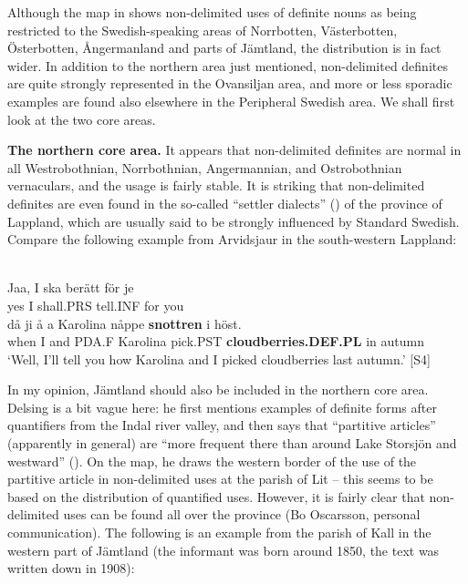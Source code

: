 Although the map in \citet{Delsing2003a} shows non-delimited uses of definite nouns as being restricted to the Swedish-speaking areas of Norrbotten, Västerbotten, Österbotten, Ångermanland and parts of Jämtland, the distribution is in fact wider. In addition to the northern area just mentioned, non-delimited definites are quite strongly represented in the Ovansiljan area, and more or less sporadic examples are found also elsewhere in the Peripheral Swedish area. We shall first look at the two core areas.


\textbf{The northern core area. }It appears that non-delimited definites are normal in all Westrobothnian, Norrbothnian, Angermannian, and Ostrobothnian vernaculars, and the usage is fairly stable. It is striking that non-delimited definites are even found in the so-called “settler dialects” () of the province of Lappland, which are usually said to be strongly influenced by Standard Swedish. Compare the following example from Arvidsjaur in the south-western Lappland:


\ea \label{} 
\\
\gll Jaa,  I  ska  berätt  för  je\\
yes  I  shall.PRS  tell.INF  for  you\\
\gll då  ji  å  a  Karolina  nåppe  \textbf{snottren} i  höst.\\
when  I  and  PDA.F  Karolina  pick.PST  \textbf{cloudberries.DEF.PL} in  autumn\\
\glt ‘Well, I’ll tell you how Karolina and I picked cloudberries last autumn.’\textsuperscript{ }[S4]

\z

In my opinion, Jämtland should also be included in the northern core area. Delsing is a bit vague here: he first mentions examples of definite forms after quantifiers from the Indal river valley, and then says that “partitive articles” (apparently in general) are “more frequent there than around Lake Storsjön and westward” (\citet[19]{Delsing2003a}). On the map, he draws the western border of the use of the partitive article in non-delimited uses at the parish of Lit – this seems to be based on the distribution of quantified uses. However, it is fairly clear that non-delimited uses can be found all over the province (Bo Oscarsson, personal communication). The following is an example from the parish of Kall in the western part of Jämtland (the informant was born around 1850, the text was written down in 1908):

